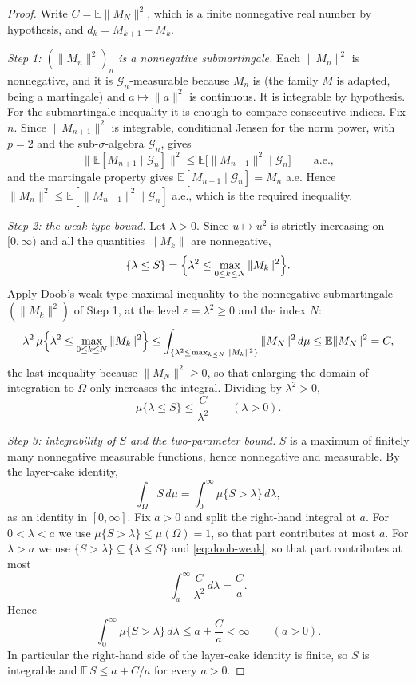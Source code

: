 \begin{proof}
Write $C=\mathbb E\|M_N\|^2$, which is a finite nonnegative real number by
hypothesis, and $d_k=M_{k+1}-M_k$.

\emph{Step 1: $(\|M_n\|^2)_n$ is a nonnegative submartingale.}
Each $\|M_n\|^2$ is nonnegative, and it is $\mathcal G_n$-measurable because
$M_n$ is (the family $M$ is adapted, being a martingale) and $a\mapsto\|a\|^2$
is continuous. It is integrable by hypothesis. For the submartingale
inequality it is enough to compare consecutive indices. Fix $n$. Since
$\|M_{n+1}\|^2$ is integrable, conditional Jensen for the norm power, with
$p=2$ and the sub-$\sigma$-algebra $\mathcal G_n$, gives
\[
  \bigl\|\mathbb E[M_{n+1}\mid\mathcal G_n]\bigr\|^2
    \le\mathbb E\bigl[\|M_{n+1}\|^2\mid\mathcal G_n\bigr]
  \qquad\text{a.e.},
\]
and the martingale property gives
$\mathbb E[M_{n+1}\mid\mathcal G_n]=M_n$ a.e. Hence
$\|M_n\|^2\le\mathbb E[\|M_{n+1}\|^2\mid\mathcal G_n]$ a.e., which is the
required inequality.

\emph{Step 2: the weak-type bound.}
Let $\lambda>0$. Since $u\mapsto u^2$ is strictly increasing on $[0,\infty)$
and all the quantities $\|M_k\|$ are nonnegative,
\[
  \{\lambda\le S\}
   =\Bigl\{\lambda^2\le\max_{0\le k\le N}\|M_k\|^2\Bigr\}.
\]
Apply Doob's weak-type maximal inequality to the nonnegative submartingale
$(\|M_k\|^2)$ of Step 1, at the level $\varepsilon=\lambda^2\ge0$ and the index
$N$:
\[
  \lambda^2\,\mu\Bigl\{\lambda^2\le\max_{0\le k\le N}\|M_k\|^2\Bigr\}
   \le\int_{\{\lambda^2\le\max_{k\le N}\|M_k\|^2\}}\|M_N\|^2\,d\mu
   \le\mathbb E\|M_N\|^2=C,
\]
the last inequality because $\|M_N\|^2\ge0$, so that enlarging the domain of
integration to $\Omega$ only increases the integral. Dividing by
$\lambda^2>0$,
\begin{equation}\label{eq:doob-weak}
  \mu\{\lambda\le S\}\le\frac{C}{\lambda^2}\qquad(\lambda>0).
\end{equation}

\emph{Step 3: integrability of $S$ and the two-parameter bound.}
$S$ is a maximum of finitely many nonnegative measurable functions, hence
nonnegative and measurable. By the layer-cake identity,
\[
  \int_\Omega S\,d\mu=\int_0^\infty\mu\{S>\lambda\}\,d\lambda ,
\]
as an identity in $[0,\infty]$. Fix $a>0$ and split the right-hand integral at
$a$. For $0<\lambda<a$ we use $\mu\{S>\lambda\}\le\mu(\Omega)=1$, so that part
contributes at most $a$. For $\lambda>a$ we use
$\{S>\lambda\}\subseteq\{\lambda\le S\}$ and \eqref{eq:doob-weak}, so that part
contributes at most
\[
  \int_a^\infty\frac{C}{\lambda^2}\,d\lambda=\frac{C}{a}.
\]
Hence
\begin{equation}\label{eq:doob-split}
  \int_0^\infty\mu\{S>\lambda\}\,d\lambda\le a+\frac Ca<\infty
  \qquad(a>0).
\end{equation}
In particular the right-hand side of the layer-cake identity is finite, so $S$
is integrable and $\mathbb E\,S\le a+C/a$ for every $a>0$.


\end{proof}
